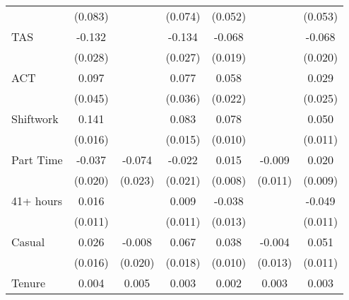 {\begin{tabular}{l*{6}{c}}
                    &     (0.083)         &                     &     (0.074)         &     (0.052)         &                     &     (0.053)         \\
TAS                 &      -0.132\sym{***}&                     &      -0.134\sym{***}&      -0.068\sym{***}&                     &      -0.068\sym{***}\\
                    &     (0.028)         &                     &     (0.027)         &     (0.019)         &                     &     (0.020)         \\
ACT                 &       0.097\sym{**} &                     &       0.077\sym{**} &       0.058\sym{***}&                     &       0.029         \\
                    &     (0.045)         &                     &     (0.036)         &     (0.022)         &                     &     (0.025)         \\
Shiftwork           &       0.141\sym{***}&                     &       0.083\sym{***}&       0.078\sym{***}&                     &       0.050\sym{***}\\
                    &     (0.016)         &                     &     (0.015)         &     (0.010)         &                     &     (0.011)         \\
Part Time           &      -0.037\sym{*}  &      -0.074\sym{***}&      -0.022         &       0.015\sym{*}  &      -0.009         &       0.020\sym{**} \\
                    &     (0.020)         &     (0.023)         &     (0.021)         &     (0.008)         &     (0.011)         &     (0.009)         \\
41+ hours           &       0.016         &                     &       0.009         &      -0.038\sym{***}&                     &      -0.049\sym{***}\\
                    &     (0.011)         &                     &     (0.011)         &     (0.013)         &                     &     (0.011)         \\
Casual              &       0.026         &      -0.008         &       0.067\sym{***}&       0.038\sym{***}&      -0.004         &       0.051\sym{***}\\
                    &     (0.016)         &     (0.020)         &     (0.018)         &     (0.010)         &     (0.013)         &     (0.011)         \\
Tenure              &       0.004\sym{***}&       0.005\sym{***}&       0.003\sym{***}&       0.002\sym{***}&       0.003\sym{***}&       0.003\sym{***}\\

\end{tabular}}
